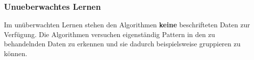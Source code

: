 \subsubsection{Unueberwachtes Lernen}
\begin{flushleft}

Im unüberwachten Lernen stehen den Algorithmen \textbf{keine} beschrifteten Daten zur Verfügung. Die Algorithmen versuchen eigenständig Pattern in den zu behandelnden Daten zu erkennen und sie dadurch beispielsweise gruppieren zu können.
\end{flushleft}




